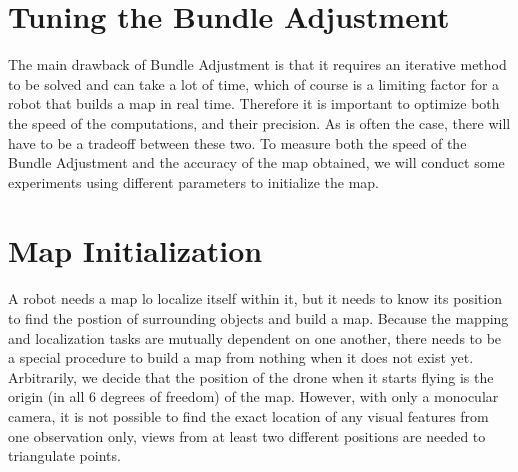 \section{Tuning the Bundle Adjustment}
The main drawback of Bundle Adjustment is that it requires an iterative method to be solved and can take a lot of time, which of course is a limiting factor for a robot that builds a map in real time. Therefore it is important to optimize both the speed of the computations, and their precision. As is often the case, there will have to be a tradeoff between these two. To measure both the speed of the Bundle Adjustment and the accuracy of the map obtained, we will conduct some experiments using different parameters to initialize the map.





\section{Map Initialization}
A robot needs a map lo localize itself within it, but it needs to know its position to find the postion of surrounding objects and build a map. Because the mapping and localization tasks are mutually dependent on one another, there needs to be a special procedure to build a map from nothing when it does not exist yet. Arbitrarily, we decide that the position of the drone when it starts flying is the origin (in all 6 degrees of freedom) of the map. However, with only a monocular camera, it is not possible to find the exact location of any visual features from one observation only, views from at least two different positions are needed to triangulate points.




